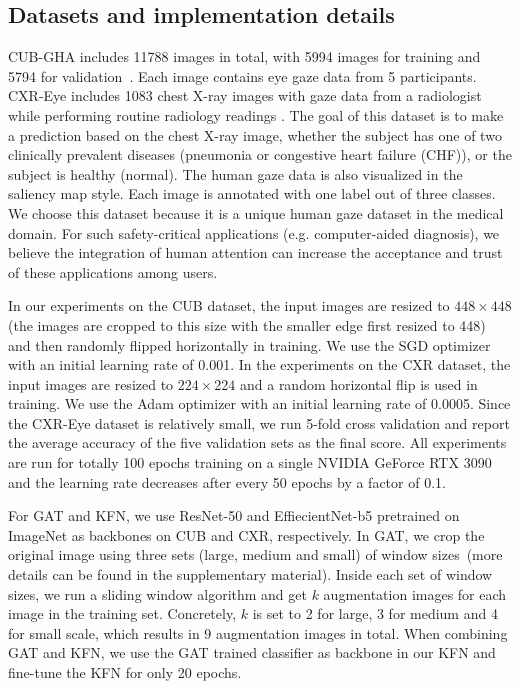 \documentclass{bmvc2k}
\begin{document}
\subsection{Datasets and implementation details}
CUB-GHA includes 11788 images in total, with 5994 images for training and 5794 for validation~\cite{WahCUB_200_2011}.
Each image contains eye gaze data from 5 participants. CXR-Eye includes 1083 chest X-ray images with gaze data from a radiologist while performing routine radiology readings \cite{Karargyris2020}. The goal of this dataset is to make a prediction based on the chest X-ray image, whether the subject has one of two clinically prevalent diseases (pneumonia or congestive heart failure (CHF)), or the subject is healthy (normal). The human gaze data is also visualized in the saliency map style. Each image is annotated with one label out of three classes. We choose this dataset because it is a unique human gaze dataset in the medical domain. For such safety-critical applications (e.g. computer-aided diagnosis), we believe the integration of human attention can increase the acceptance and trust of these applications among users.
 
In our experiments on the CUB dataset, the input images are resized to $448 \times 448$ (the images are cropped to this size with the smaller edge first resized to 448) and then randomly flipped horizontally in training. We use the SGD optimizer \cite{ruder2016overview} with an initial learning rate of 0.001. In the experiments on the CXR dataset, the input images are resized to $224 \times 224$ and a random horizontal flip is used in training. We use the Adam optimizer \cite{kingma2014adam} with an initial learning rate of 0.0005. Since the CXR-Eye dataset is relatively small, we run 5-fold cross validation and report the average accuracy of the five validation sets as the final score. All experiments are run for totally 100 epochs training on a single NVIDIA GeForce RTX 3090 and the learning rate decreases after every 50 epochs by a factor of 0.1.

For GAT and KFN, we use ResNet-50 \cite{he2016deep} and EffiecientNet-b5 \cite{tan2019efficientnet} pretrained on ImageNet as backbones on CUB and CXR, respectively. In GAT, we crop the original image using three sets (large, medium and small) of window sizes~(more details can be found in the supplementary material).
Inside each set of window sizes, we run a sliding window algorithm and get $k$ augmentation images for each image in the training set. Concretely, $k$ is set to 2 for large, 3 for medium and 4 for small scale, which results in 9 augmentation images in total. When combining GAT and KFN, we use the GAT trained classifier as backbone in our KFN and fine-tune the KFN for only 20 epochs. 
\end{document}
